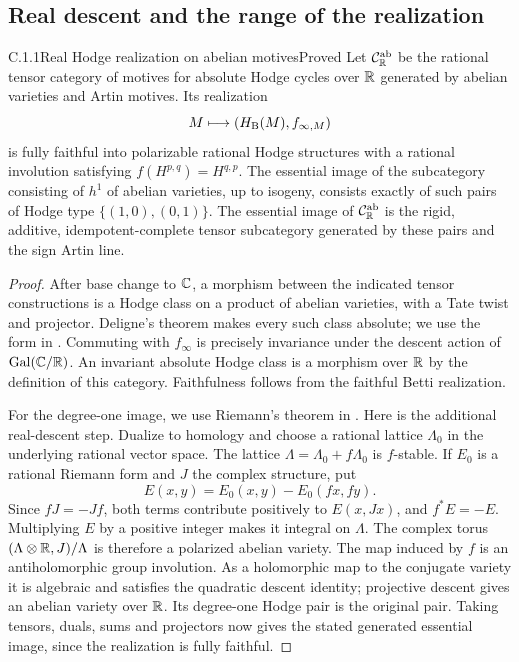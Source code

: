 \subsection{Real descent and the range of the realization}

\begin{result}{C.1.1}{Real Hodge realization on abelian motives}{Proved}
Let $\mathcal C_{\mathbb R}^{\mathrm{ab}}$ be the rational tensor category of motives for absolute Hodge cycles over $\mathbb R$ generated by abelian varieties and Artin motives. Its realization
\[
 M\longmapsto (H_{\mathrm B}(M),f_{\infty,M})
\]
is fully faithful into polarizable rational Hodge structures with a rational involution satisfying $f(H^{p,q})=H^{q,p}$. The essential image of the subcategory consisting of $h^1$ of abelian varieties, up to isogeny, consists exactly of such pairs of Hodge type $\{(1,0),(0,1)\}$. The essential image of $\mathcal C_{\mathbb R}^{\mathrm{ab}}$ is the rigid, additive, idempotent-complete tensor subcategory generated by these pairs and the sign Artin line.
\end{result}
\begin{proof}
After base change to $\mathbb C$, a morphism between the indicated tensor constructions is a Hodge class on a product of abelian varieties, with a Tate twist and projector. Deligne's theorem makes every such class absolute; we use the form in \cite[Theorem 58]{CharlesSchnell}. Commuting with $f_\infty$ is precisely invariance under the descent action of $\operatorname{Gal}(\mathbb C/\mathbb R)$. An invariant absolute Hodge class is a morphism over $\mathbb R$ by the definition of this category. Faithfulness follows from the faithful Betti realization.

For the degree-one image, we use Riemann's theorem in \cite[Theorem 6.20 and Proposition 6.21]{DM1982}. Here is the additional real-descent step. Dualize to homology and choose a rational lattice $\Lambda_0$ in the underlying rational vector space. The lattice $\Lambda=\Lambda_0+f\Lambda_0$ is $f$-stable. If $E_0$ is a rational Riemann form and $J$ the complex structure, put
\[
 E(x,y)=E_0(x,y)-E_0(fx,fy).
\]
Since $fJ=-Jf$, both terms contribute positively to $E(x,Jx)$, and $f^*E=-E$. Multiplying $E$ by a positive integer makes it integral on $\Lambda$. The complex torus $(\Lambda\otimes\mathbb R,J)/\Lambda$ is therefore a polarized abelian variety. The map induced by $f$ is an antiholomorphic group involution. As a holomorphic map to the conjugate variety it is algebraic and satisfies the quadratic descent identity; projective descent gives an abelian variety over $\mathbb R$. Its degree-one Hodge pair is the original pair. Taking tensors, duals, sums and projectors now gives the stated generated essential image, since the realization is fully faithful.
\end{proof}

